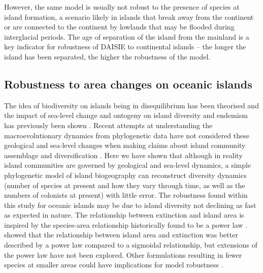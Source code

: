 \documentclass{article}
\begin{document}
However, the same model is usually not robust to the presence of species at island formation, a scenario likely in islands that break away from the continent or are connected to the continent by lowlands that may be flooded during interglacial periods. The age of separation of the island from the mainland is a key indicator for robustness of DAISIE to continental islands – the longer the island has been separated, the higher the robustness of the model.

\subsection*{Robustness to area changes on oceanic islands}

The idea of biodiversity on islands being in disequilibrium has been theorised \citep{whittaker_general_2008, fernandezpalacios_towards_2016} and the impact of sea-level change and ontogeny on island diversity and endemism has previously been shown \citep{lim_true_2017, norder_beyond_2019}. Recent attempts at understanding the macroevolutionary dynamics from phylogenetic data have not considered these geological and sea-level changes when making claims about island community assemblage and diversification \citep{valente_equilibrium_2015, valente_simple_2020}. Here we have shown that although in reality island communities are governed by geological and sea-level dynamics, a simple phylogenetic model of island biogeography can reconstruct diversity dynamics (number of species at present and how they vary through time, as well as the numbers of colonists at present) with little error. The robustness found within this study for oceanic islands may be due to island diversity not declining as fast as expected in nature. The relationship between extinction and island area is inspired by the species-area relationship historically found to be a power law \citep{dengler_which_2009}. \cite{valente_simple_2020} showed that the relationship between island area and extinction was better described by a power law compared to a sigmoidal relationship, but extensions of the power law have not been explored. Other formulations resulting in fewer species at smaller areas could have implications for model robustness \citep{plotkin_predicting_2000}. \\
\end{document}
